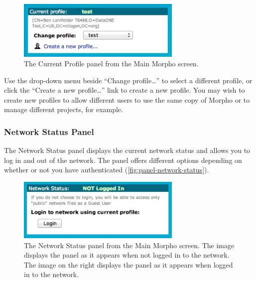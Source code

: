 \begin{figure}
  \centering
    \includegraphics[width=0.7\textwidth]{images/panel-profile.jpg}
  \caption{The Current Profile panel from the Main Morpho screen.}
  \label{fig:panel-profile}
\end{figure}

Use the drop-down menu beside ``Change profile\ldots'' to select a
different profile, or click the ``Create a new profile\ldots'' link to
create a new profile. You may wish to create new profiles to allow
different users to use the same copy of Morpho or to manage different
projects, for example.

\subsubsection[Network Status]{Network Status Panel}
\label{sec:panel-network-status}

The Network Status panel displays the current network status and allows
you to log in and out of the network. The panel offers different
options depending on whether or not you have authenticated 
(\autoref{fig:panel-network-status}).

\begin{figure}
  \centering
    \includegraphics[width=0.7\textwidth]{images/panel-network-status.jpg}
  \caption{The Network Status panel from the Main Morpho screen. The
    image displays the panel as it appears when not logged
    in to the network. The image on the right displays the panel as
    it appears when logged in to the network.}
  \label{fig:panel-network-status}
\end{figure}

